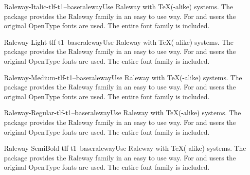 \documentclass{ddltxtyp}
\begin{document}
\begin{package}{Raleway-Italic-tlf-t1--base}{raleway}{Use Raleway with {\TeX}(-alike) systems.}
The package provides the Raleway family in an easy to use way.
For {\XeLaTeX} and {\LuaLaTeX} users the original OpenType fonts are
used. The entire font family is included.
\end{package}
\begin{package}{Raleway-Light-tlf-t1--base}{raleway}{Use Raleway with {\TeX}(-alike) systems.}
The package provides the Raleway family in an easy to use way.
For {\XeLaTeX} and {\LuaLaTeX} users the original OpenType fonts are
used. The entire font family is included.
\end{package}
\begin{package}{Raleway-Medium-tlf-t1--base}{raleway}{Use Raleway with {\TeX}(-alike) systems.}
The package provides the Raleway family in an easy to use way.
For {\XeLaTeX} and {\LuaLaTeX} users the original OpenType fonts are
used. The entire font family is included.
\end{package}
\begin{package}{Raleway-Regular-tlf-t1--base}{raleway}{Use Raleway with {\TeX}(-alike) systems.}
The package provides the Raleway family in an easy to use way.
For {\XeLaTeX} and {\LuaLaTeX} users the original OpenType fonts are
used. The entire font family is included.
\end{package}
\begin{package}{Raleway-SemiBold-tlf-t1--base}{raleway}{Use Raleway with {\TeX}(-alike) systems.}
The package provides the Raleway family in an easy to use way.
For {\XeLaTeX} and {\LuaLaTeX} users the original OpenType fonts are
used. The entire font family is included.
\end{package}
\end{document}
